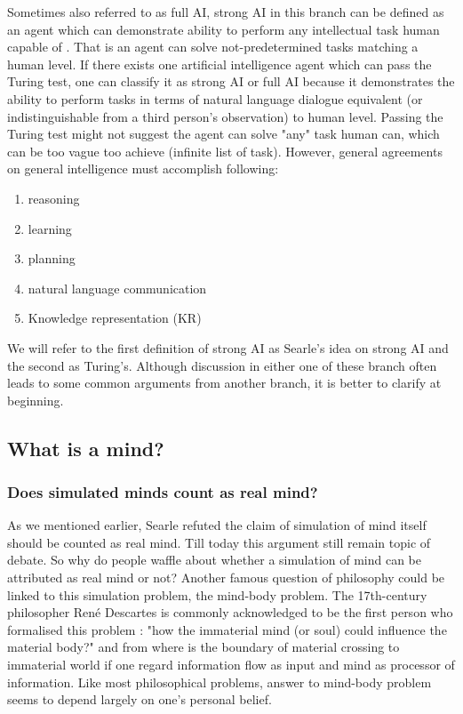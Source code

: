 \documentclass[11pt]{article}
\newcommand{\dr}[1]{{\color{dark-cornflower-blue-2} #1}}
\newenvironment{draft}{\color{dark-cornflower-blue-2}}{\ignorespacesafterend}
\begin{document}
\begin{draft}
Sometimes also referred to as full AI, strong AI in this branch can be defined as an agent which can demonstrate ability to perform any intellectual task human capable of \cite{kurzweil2005singularity}. That is an agent can solve not-predetermined tasks matching a human level. If there exists one artificial intelligence agent which can pass the Turing test, one can classify it as strong AI or full AI because it demonstrates the ability to perform tasks in terms of natural language dialogue equivalent (or indistinguishable from a third person's observation) to human level. Passing the Turing test might not suggest the agent can solve "any" task human can, which can be too vague too achieve (infinite list of task). However, general agreements on general intelligence must accomplish following:
\begin{enumerate}
\item reasoning
\item learning
\item planning
\item natural language communication
\item Knowledge representation (KR) 
\end{enumerate}

We will refer to the first definition of strong AI as Searle's idea on strong AI and the second as Turing's. Although discussion in either one of these branch often leads to some common arguments from another branch, it is better to clarify at beginning. 
\end{draft}

\subsection{What is a mind?}
\label{sec:what_is_a_mind}

\subsubsection*{Does simulated minds count as real mind?}

\dr{
As we mentioned earlier, Searle refuted the claim of simulation of mind itself should be counted as real mind. Till today this argument still remain topic of debate. So why do people waffle about whether a simulation of mind can be attributed as real mind or not? Another famous question of philosophy could be linked to this simulation problem, the mind-body problem. The 17th-century philosopher Ren{\'e} Descartes is commonly acknowledged to be the first person who formalised this problem \cite{descartes1641meditationes}: "how the immaterial mind (or soul) could influence the material body?" and from where is the boundary of material crossing to immaterial world if one regard information flow as input and mind as processor of information. Like most philosophical problems, answer to mind-body problem seems to depend largely on one's personal belief.
}
\end{document}
